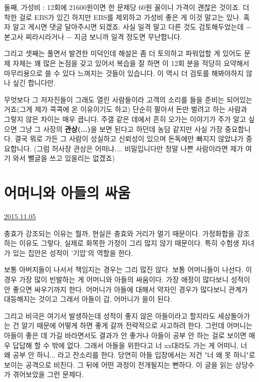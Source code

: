 둘째, 가성비 : 12회에 21600원이면 한 문제당 60원 꼴이니 가격이 괜찮은 것이죠.
더 착한 걸로 EBS가 있긴 하지만 EBS를 제외하고 가성비 좋은 게 이것 말고는 있나. 혹자 알고 게시면 댓글 달아주시면 되겠죠.
사실 일격 말고 다른 것도 검토해두었는데 $-$ 본고사 찌라시라거나 $-$ 지금 보니까 일격 정도면 무난합니다.
\vspace{5mm}

그리고 셋째는 풀면서 발견한 미덕인데
해설은 좀 더 토의하고 파워업할 게 있어도 문제 자체는 꽤 많은 논점을 갖고 있어서
복습을 잘 하면 이 12회 분을 적당히 요약해서 마무리용으로 쓸 수 있다 느껴지는 것들이 있습니다.
이 역시 더 검토를 해봐야하지 않나 싶긴 합니다만.
\vspace{5mm}

무엇보다 그 저자진들이 그래도 열린 사람들이라 고객의 소리를 들을 준비는 되어있는 거죠(그게 제가 콕콕에 온 이유이기도 하고)
단순히 팔아서 돈만 벌려고 하는 사람과 그렇지 않은 차이는 매우 큽니다.
주갤 같은 데에서 흔히 오가는 이야기가 주가 알고 싶으면 그냥 그 사장의 \textbf{관상(...)}을 보면 된다고 하던데
농담 같지만 사실 가장 중요합니다. 결국 뭐로 가든 그 사람이 성실하고 신뢰성이 있으며 돈독에만 빠지지 않았냐가 중요합니다.
(그럼 허사장 관상은 어떠냐.... 비밀입니다만 정말 나쁜 사람이라면 제가 여기 와서 뻘글을 쓰고 있을리는 없겠죠)
\vspace{5mm}






\section{어머니와 아들의 싸움}
\href{https://www.kockoc.com/Apoc/464553}{2015.11.05}

\vspace{5mm}

충효가 강조되는 이유는 뭘까, 현실은 충효와 거리가 멀기 때문이다.
가정화합을 강조하는 이유도 그렇다, 실제로 화목한 가정이 그리 많지 않기 때문이다.
특히 수험생 자녀가 있는 집안은 성적이 '기압'의 역할을 한다.
\vspace{5mm}

보통 아버지들이 나서서 책임지는 경우는 그리 많진 않다. 보통 어머니들이 나선다.
이 경우 가장 많이 빈발하는 게 어머니와 아들의 싸움이다. 가장 애정이 많다보니 성적이 안 좋으면 싸우기까지 한다.
어머니가 아들에 대해서 약자인 경우가 많다보니 관계가 대등해지는 것이고
그래서 아들이 갑, 어머니가 을이 된다.
\vspace{5mm}

그리고 비극은 여기서 발생하는데
성적이 좋지 않은 아들이라고 할지라도 세상돌아가는 건 알기 때문에 어떻게 하면 좋게 갈까 전략적으로 사고하려 한다.
그런데 어머니는 아들이 좋은 데 가길 바라면서도 결과가 안 좋거나 아들이 공부 안 하는 걸로 보이면 매우 답답해 할 수 밖에 없다.
그래서 아들을 위한다고 너 xx대라도 가는 게 어떠니, 너 왜 공부 안 하니... 라고 잔소리를 한다.
당연히 아들 입장에서는 저건 "너 왜 못 하니"로 보이는 공격으로 비친다. 그 뒤에 어떤 과정이 전개될지는 뻔하다.
이 글을 읽는 상당수가 겪어보았을 그런 문제다.
\vspace{5mm}

